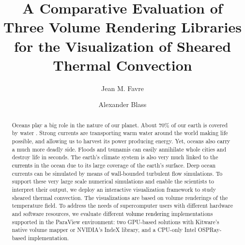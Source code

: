 \documentclass[5p,times]{elsarticle}
\begin{document}
\begin{frontmatter}



\title{A Comparative Evaluation of Three Volume Rendering Libraries for the Visualization of Sheared Thermal Convection}


\author[CSCS]{Jean M. Favre}


\author[Twente]{Alexander Blass}

\address[CSCS]{Swiss National Supercomputing Center (CSCS), Via Trevano 131, CH-6900 Lugano, Switzerland}
\address[Twente]{Physics of Fluids Group, Max Planck Center for Complex Fluid Dynamics,
J. M. Burgers Center for Fluid Dynamics and MESA+ Research Institute,
Department of Science and Technology,
University of Twente, P.O. Box 217, 7500 AE Enschede, The Netherlands}

\begin{abstract}
Oceans play a big role in the nature of our planet. About $ 70 \% $ of our earth
is covered by water \cite{int14}. Strong currents are transporting warm water around the world making life possible, and allowing us to harvest its
power producing energy. Yet, oceans also
\textcolor{black}{carry} a much more deadly side. Floods and tsunamis can easily annihilate whole
cities and destroy life in seconds. The earth's climate system is also very much
linked to the \textcolor{black}{currents} in the ocean due to its large coverage of the earth's surface.
Deep ocean currents can be simulated by means of wall-bounded turbulent flow simulations.
To support these very large scale numerical simulations and enable the scientists to interpret their output,
we deploy an interactive visualization framework to study sheared thermal convection.
The visualizations are based on volume renderings of the temperature field.
To address the needs of supercomputer users with different hardware and software resources,
we evaluate different \textcolor{black}{volume rendering} implementations supported in the ParaView \cite{Ahrens2005} environment:
two GPU-based solutions with Kitware's native volume mapper or NVIDIA's IndeX library,
and a CPU-only Intel OSPRay-based implementation.


\end{abstract}
\end{frontmatter}
\end{document}
